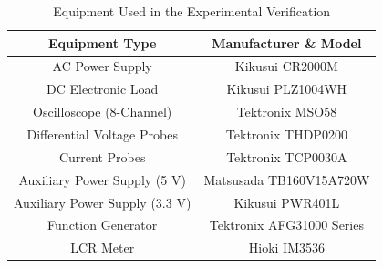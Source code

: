 \documentclass[lettersize,journal]{IEEEtran}
\begin{document}
\begin{table}[b!] %
    \caption{{\color{red}Equipment Used in the Experimental Verification}}
    \centering
    \footnotesize
    \setlength{\tabcolsep}{3pt}
    \begin{tabular}{cc}
        \hline
        \textbf{Equipment Type} & \textbf{Manufacturer \& Model} \\
        \hline \hline
        AC Power Supply & Kikusui CR2000M \\
        DC Electronic Load & Kikusui PLZ1004WH \\
        Oscilloscope (8-Channel) & Tektronix MSO58 \\
        Differential Voltage Probes & Tektronix THDP0200 \\
        Current Probes & Tektronix TCP0030A \\
        Auxiliary Power Supply (5 V) & Matsusada TB160V15A720W \\
        Auxiliary Power Supply (3.3 V) & Kikusui PWR401L \\
        Function Generator & Tektronix AFG31000 Series \\
        LCR Meter & Hioki IM3536 \\
        \hline
    \end{tabular}
    \label{tab:equipment}
\end{table}
\end{document}
